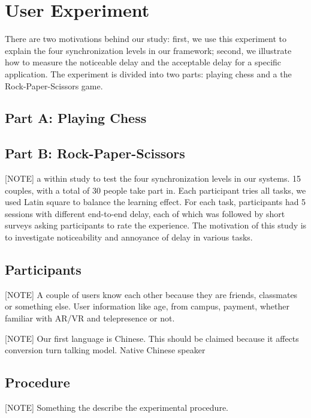 \section{User Experiment}

There are two motivations behind our study: first, we use this experiment to explain the four synchronization levels in our framework; second, we illustrate how to measure the noticeable delay and the acceptable delay for a specific application. The experiment is divided into two parts: playing chess and a the Rock-Paper-Scissors game.

\subsection{Part A: Playing Chess}



\subsection{Part B: Rock-Paper-Scissors}

[NOTE] a within study to test the four synchronization levels in our systems. 15 couples, with a total of 30 people take part in. Each participant tries all tasks, we used Latin square to balance the learning effect. For each task, participants had 5 sessions with different end-to-end delay, each of which was followed by short surveys asking participants to rate the experience. The motivation of this study is to investigate noticeability and annoyance of delay in various tasks. 

\subsection{Participants}

[NOTE] A couple of users know each other because they are friends, classmates or something else. User information like age, from campus, payment, whether familiar with AR/VR and telepresence or not.

[NOTE] Our first language is Chinese. This should be claimed because it affects conversion turn talking model. Native Chinese speaker

\subsection{Procedure}

[NOTE] Something the describe the experimental procedure.

